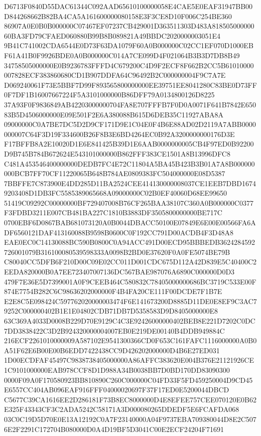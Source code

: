 \documentclass[UTF8,fontset=fandol,zihao=-4,a4paper]{ctexart}
\begin{document}
{{D6713F0840D55DAC61344C092AAD65610100000058E4CAE5E0EAF31947BB00D844268662B82BA4CA5A161600000080158E3F3CE8D10F006C254BE360
86907A0E0B0B000000C07467EF07237CB429001D363511303D483A81850500000060BA3FD79CFAED060880B99B8B089821A49BBDC2020000003051E4
9B41C741002CDA6544E0D73F63DA1079F60A0B000000C02CC1EF070D1000EBF61A41B0F9926BDE0A0B000000C014A7CE099D4F021064B3B3D7DB8B49
34758505000000E0B9236783FFFD4C679200C4D9F2ECF8F662B2CC5B61010000007828ECF383860680CD1B907DDFA64C96492B2C000000004F9C7A7E
D069240061F73E5BBF7D99F893565800000000EE39751EE8041280C83BE0D73FF0F7DF1B16007667224F5A3101000000B86DFF79A0134800126D8225
37A93F0F9836849AB42203000000704FA8E707FFFB7F0D0A0071F641B7842E65083B5D4506000000E09E501F2E6A380088B615D6DEB35C11927ABA8A
09000000C0A7BE7DC5D2D9CF171D9E1C04E0F4B6E88AD02D2119A7ABB0000000007C64F3D19F334600B26F8B3E6BD4264EC0B92A3200000000176D3E
F17BFFB8A2E10020D1E6E841425B39D1E6AAB0000000005CB4F97ED0B92200D9B745B784B672624E543101000000B862FFF383CE1501A8B13996DFC8
C481A453546400000000DEDB7FC4E72C11804A5BA45B423B3B01A7A8B000000000BCB7FF70CF11220065B648B784AE0809383FC504000000E08D5387
7BBFFE7C873900E4DD285D11BA2524CEE414130000008037CE1EEB7DBD16749203408D1DB3FC5585389065668A09000000C02B0EF40060D68EE99650
51419C09292C00000000BF729407008B76CF265BAA38107C360A0B000000C0377F3FDBD3211E007CB481BA227C1810B3883DF3505800000000BE717C
0700EBF6D0867BAB681073120A0B0044DBACC50100E07849E6E00E00566FA6ADF6560121DAF413160088B9598B0600C0F192CC791D00ACDB4F3D48A8
EAE0EC0C14130088BC590B0800C0A94ACC491D00ECD95BBBEDB3624284592726001079B316100080539598333A0098B2BD0E37620F0A0FE5074BE79B
C80040CC5DFB6F210D00C09E02CC011D001CDC675D112A42D839E5C40400C2EEDA820000B0A7EE723407007136DC567BAE987076A6890C000000D0D3
479F7E36E5D7399001A0F9CEEB464C580832C78405000000686BC3719C533E00F874E7754B282C6C98636202000000F4B4FA20CE111F00DCDE7F1B7E
E2E8C5E098424C597762020000003474F6E141673200D8885D11DE0E8EF9C3AC79252C000000402B1E1E04802CDB71DB7D5358583D9D8405000000E8
63C369A4033D0008B229D70E9129C4C3E92426000000402BEB8E221D7202C0DC7DD3838422C3D2B924320000004007EB0E219DE00140B4DDB949884C
216ECF2261010000009A587102E9541300366CD0F653C161FAFC1116000000A0B0A51F62E6B00E00B6EDD7422438CC9D426202000000D4B6E27ED031
1D00ECDFAF45497C9838738405000000A86AFFC383620E004B376E21121926CE1C9101000000EAB978CCF8D1D988A34B0038BB7D0BD170DD83090300
0000F09A0F170580923BB810890C260C000000C04FD33F5FD459250004D9CD45E6557CC404AB096EAF916FFF04000020697F37F17ED0E5200044DBCD
C5677C39CA1616EE2D286181F73B8EC8000000D4E8EFEE757CEE070120E0B62E325F43343CF3C2ADA5242C58171A3D000080265DDEDF5E6FCAFDA068
03C0C19D5D70E0E13A12192C0A7F23140000A04F9737EBA709380044D8E2C5076E2F2291C172704B080000D0A4D19BF5D3041C00E2ECF24204F71691
}}
\end{document}
